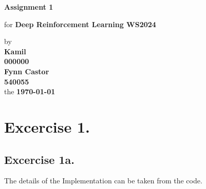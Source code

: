 \documentclass[12pt, a4paper,DIV=12, bibliography=totocnumbered]{scrartcl}
\newcommand{\ASSNR}{1}
\newcommand{\AuthorONE}{Kamil}
\newcommand{\MatNoONE}{000000}
\newcommand{\AuthorTWO}{Fynn Castor}
\newcommand{\MatNoTWO}{540055}
\begin{document}
\begin{titlepage}
   \begin{center}
       \vspace*{5cm}

       \textbf{\Huge{Assignment \ASSNR}}

       \vspace{0.5cm}
        for {\large\textbf{Deep Reinforcement Learning WS2024}}
        \vspace{0.75cm}

       by \\
        \textbf{\AuthorONE}\\
        \vspace{0.125cm}
       	\textbf{\MatNoONE}\\ 
       	\vspace{0.25cm}
        \textbf{\AuthorTWO}\\
        \vspace{0.125cm}
       	\textbf{\MatNoTWO}\\ 
       	\vspace{0.25cm}
       the \textbf{\today}

       \vfill
    
    
            
   \end{center}
\end{titlepage}

\section{Excercise 1.}
\subsection{Excercise 1a.}
The details of the Implementation can be taken from the code.
\end{document}
